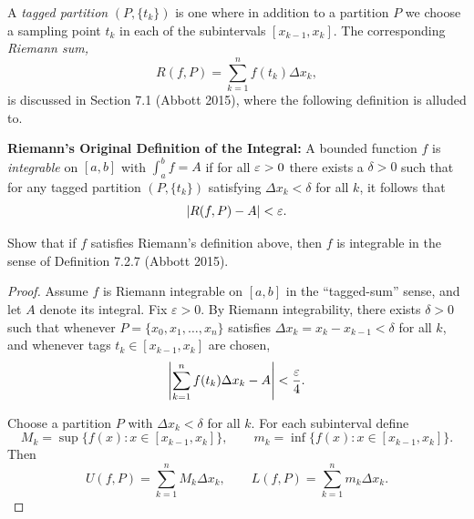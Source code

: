 \begin{problem}
  A \textit{tagged partition} $(P, \{t_k\})$ is one where in addition to a partition $P$ 
  we choose a sampling point $t_k$ in each of the subintervals $[x_{k-1}, x_k]$. The corresponding \textit{Riemann sum,}
  \[
  R(f, P) = \sum_{k=1}^{n} f(t_k)\Delta x_k,
  \]
  is discussed in Section 7.1 (Abbott 2015), where the following definition is alluded to.

  \noindent
  \textbf{Riemann's Original Definition of the Integral:} A bounded function $f$ is \textit{integrable} on $[a,b]$
  with $\int_a^b f = A$ if for all $\varepsilon > 0$ there exists a $\delta > 0$ such that for any tagged partition $(P, \{t_k\})$
  satisfying $\Delta x_k < \delta$ for all $k$, it follows that
  \[
    \left\lvert R(f, P) - A \right\rvert < \varepsilon.
  \]

  Show that if $f$ satisfies Riemann's definition above, then $f$ is integrable in the sense of Definition 7.2.7 (Abbott 2015).

  \begin{proof}
    Assume $f$ is Riemann integrable on $[a,b]$ in the ``tagged-sum'' sense, and let $A$ denote its integral.
    Fix $\varepsilon>0$. By Riemann integrability, there exists $\delta > 0$ such that whenever
    $P=\{ x_0, x_1, \dots, x_n \}$ satisfies $\Delta x_k = x_k - x_{k-1} < \delta$ for all $k$,
    and whenever tags $t_k \in [x_{k-1},x_k]$ are chosen,
    \[
      \left\lvert \sum_{k=1}^n f(t_k)\Delta x_k - A \right\rvert<\frac{\varepsilon}{4}.
    \]

    Choose a partition $P$ with $\Delta x_k<\delta$ for all $k$.
    For each subinterval define
    \[
      M_k = \sup\{ f(x) : x \in [x_{k-1}, x_k] \}, \qquad m_k = \inf\{ f(x) : x \in [x_{k-1}, x_k] \}.
    \]
    Then
    \[
      U(f,P)=\sum_{k=1}^n M_k\Delta x_k, \qquad L(f,P)=\sum_{k=1}^n m_k\Delta x_k. 
    \]


\end{proof}
\end{problem}
